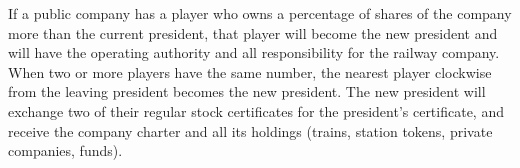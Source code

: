 \documentclass{article}
\begin{document}
\begin{CJK}{UTF8}{min}
If a public company has a player who owns a percentage of shares of
the company more than the current president, that player will become
the new president and will have the operating authority and all
responsibility for the railway company. When two or more players have
the same number, the nearest player clockwise from the leaving
president becomes the new president. The new president will exchange
two of their regular stock certificates for the president's
certificate, and receive the company charter and all its holdings
(trains, station tokens, private companies, funds).

















\end{CJK}
\end{document}
